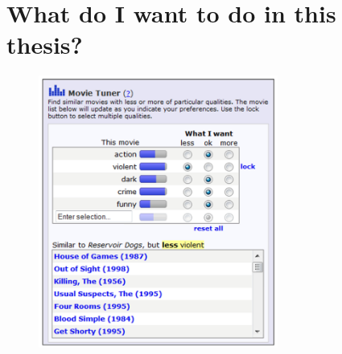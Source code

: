 


\section{What do I want to do in this thesis?}


\begin{figure}[H]
	\centering
	\includegraphics[width=0.7\textwidth]{graphics/stolenfigures/movietuner.png}
\end{figure}

